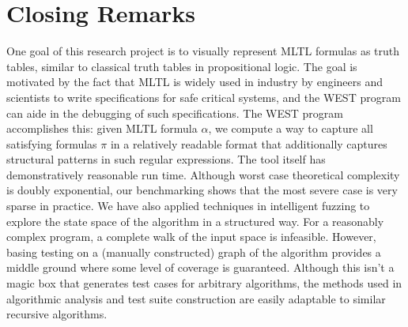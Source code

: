 \documentclass[runningheads]{llncs}
\begin{document}
\section{Closing Remarks}
\label{Conclusion}
 One goal of this research project is to visually represent MLTL formulas as truth tables, similar to classical truth tables in propositional logic. 
The goal is motivated by the fact that MLTL is widely used in industry by engineers and scientists to write specifications for safe critical systems, and the WEST program can aide in the debugging of such specifications. 
The WEST program accomplishes this: given MLTL formula $\alpha$, we compute a way to capture all satisfying formulas $\pi$ in a relatively readable format that additionally captures structural patterns in such regular expressions. 
The tool itself has demonstratively reasonable run time. 
Although worst case theoretical complexity is doubly exponential, our benchmarking shows that the most severe case is very sparse in practice. 
We have also applied techniques in intelligent fuzzing to explore the state space of the algorithm in a structured way. 
For a reasonably complex program, a complete walk of the input space is infeasible. 
However, basing testing on a (manually constructed) graph of the algorithm provides a middle ground where some level of coverage is guaranteed. 
Although this isn't a magic box that generates test cases for arbitrary algorithms, the methods used in algorithmic analysis and test suite construction are easily adaptable to similar recursive algorithms.
\end{document}
